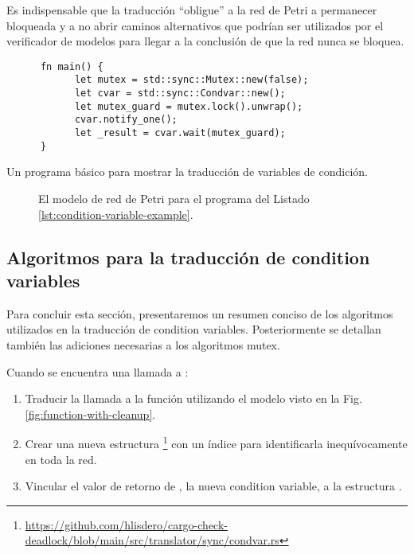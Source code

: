 Es indispensable que la traducción ``obligue'' a la red de Petri a permanecer bloqueada y a no
abrir caminos alternativos que podrían ser utilizados por el verificador de modelos para llegar a
la conclusión de que la red nunca se bloquea.

\begin{listing}[!htbp]
      \begin{verbatim}
      fn main() {
            let mutex = std::sync::Mutex::new(false);
            let cvar = std::sync::Condvar::new();
            let mutex_guard = mutex.lock().unwrap();
            cvar.notify_one();
            let _result = cvar.wait(mutex_guard);
      }     
      \end{verbatim}
      \caption{Un programa básico para mostrar la traducción de variables de condición.}
      \label{lst:condition-variable-example}
\end{listing}

\begin{figure}[!htbp]
      \centering
      
      \caption{El modelo de red de Petri para el programa del Listado \ref{lst:condition-variable-example}.}
      \label{fig:condition-variable-example}
\end{figure}

\subsection{Algoritmos para la traducción de condition variables}
\label{sec:condvar-algorithms}

Para concluir esta sección, presentaremos un resumen conciso de los algoritmos utilizados en la
traducción de condition variables.
Posteriormente se detallan también las adiciones necesarias a los algoritmos mutex.

Cuando se encuentra una llamada a :

\begin{enumerate}
      \item Traducir la llamada a la función utilizando el modelo visto en la Fig. \ref{fig:function-with-cleanup}.
      \item Crear una nueva estructura \footnote{\url{https://github.com/hlisdero/cargo-check-deadlock/blob/main/src/translator/sync/condvar.rs}}
            con un índice para identificarla inequívocamente en toda la red.
      \item Vincular el valor de retorno de ,
            la nueva condition variable, a la estructura .
\end{enumerate}

